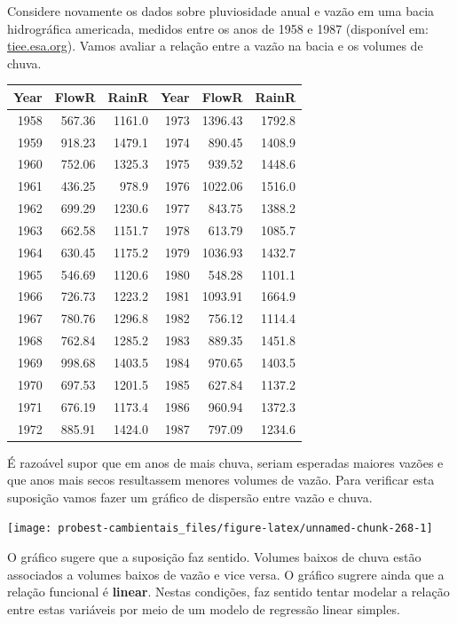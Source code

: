 \documentclass[
]{book}
\begin{document}
Considere novamente os dados sobre pluviosidade anual e vazão em uma bacia hidrográfica americada, medidos entre os anos de 1958 e 1987 (disponível em: \href{https://tiee.esa.org/vol/v1/data_sets/hubbard/hubbard_overview.html}{tiee.esa.org}). Vamos avaliar a relação entre a vazão na bacia e os volumes de chuva.

\begin{tabular}{r|r|r|r|r|r}
\hline
Year & FlowR & RainR & Year & FlowR & RainR\\
\hline
1958 & 567.36 & 1161.0 & 1973 & 1396.43 & 1792.8\\
\hline
1959 & 918.23 & 1479.1 & 1974 & 890.45 & 1408.9\\
\hline
1960 & 752.06 & 1325.3 & 1975 & 939.52 & 1448.6\\
\hline
1961 & 436.25 & 978.9 & 1976 & 1022.06 & 1516.0\\
\hline
1962 & 699.29 & 1230.6 & 1977 & 843.75 & 1388.2\\
\hline
1963 & 662.58 & 1151.7 & 1978 & 613.79 & 1085.7\\
\hline
1964 & 630.45 & 1175.2 & 1979 & 1036.93 & 1432.7\\
\hline
1965 & 546.69 & 1120.6 & 1980 & 548.28 & 1101.1\\
\hline
1966 & 726.73 & 1223.2 & 1981 & 1093.91 & 1664.9\\
\hline
1967 & 780.76 & 1296.8 & 1982 & 756.12 & 1114.4\\
\hline
1968 & 762.84 & 1285.2 & 1983 & 889.35 & 1451.8\\
\hline
1969 & 998.68 & 1403.5 & 1984 & 970.65 & 1403.5\\
\hline
1970 & 697.53 & 1201.5 & 1985 & 627.84 & 1137.2\\
\hline
1971 & 676.19 & 1173.4 & 1986 & 960.94 & 1372.3\\
\hline
1972 & 885.91 & 1424.0 & 1987 & 797.09 & 1234.6\\
\hline
\end{tabular}

É razoável supor que em anos de mais chuva, seriam esperadas maiores vazões e que anos mais secos resultassem menores volumes de vazão. Para verificar esta suposição vamos fazer um gráfico de dispersão entre vazão e chuva.

\begin{center}\texttt{[image: probest-cambientais\_files/figure-latex/unnamed-chunk-268-1]} \end{center}

O gráfico sugere que a suposição faz sentido. Volumes baixos de chuva estão associados a volumes baixos de vazão e vice versa. O gráfico sugrere ainda que a relação funcional é \textbf{linear}. Nestas condições, faz sentido tentar modelar a relação entre estas variáveis por meio de um modelo de regressão linear simples.
\end{document}
